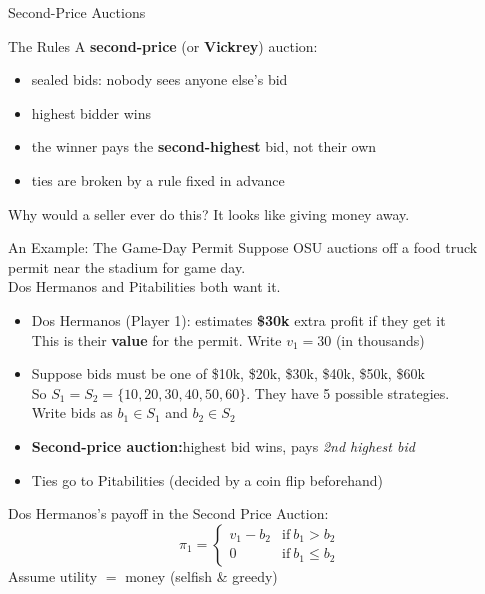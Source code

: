 
\begin{frame}[standout]
Second-Price Auctions
\end{frame}

\begin{frame}{The Rules}
A \textbf{second-price} (or \textbf{Vickrey}) auction:
\begin{itemize}
    \item sealed bids: nobody sees anyone else's bid
    \item highest bidder wins
    \item the winner pays the \textbf{second-highest} bid, not their own
    \item ties are broken by a rule fixed in advance
\end{itemize}
\bsk
Why would a seller ever do this? It looks like giving money away.
\vfill
\vspace{0.9in}
\end{frame}

\begin{frame}{An Example: The Game-Day Permit}
Suppose OSU auctions off a food truck permit near the stadium for game day.\\
Dos Hermanos and Pitabilities both want it.
\bsk
\begin{itemize}
    \item Dos Hermanos (Player 1): estimates \textbf{\$30k} extra profit if they get it\\
    This is their \textbf{value} for the permit. Write $v_1=30$ (in thousands)
    \item Suppose bids must be one of \$10k, \$20k, \$30k, \$40k, \$50k, \$60k\\
    So $S_1=S_2=\{10,20,30,40,50,60\}$. They have 5 possible strategies.\\
    Write bids as $b_1\in S_1$ and $b_2\in S_2$
    \item \textbf{Second-price auction:}highest bid wins, pays \textit{2nd highest bid}
    \item Ties go to Pitabilities (decided by a coin flip beforehand)
\end{itemize}
\bsk
Dos Hermanos's payoff in the Second Price Auction:
$$\pi_1 = \begin{cases} v_1 - b_2 & \text{if}\ b_1>b_2 \\ 0 & \text{if}\ b_1\leq b_2\end{cases}$$
Assume utility $=$ money (selfish \& greedy)
\end{frame}

